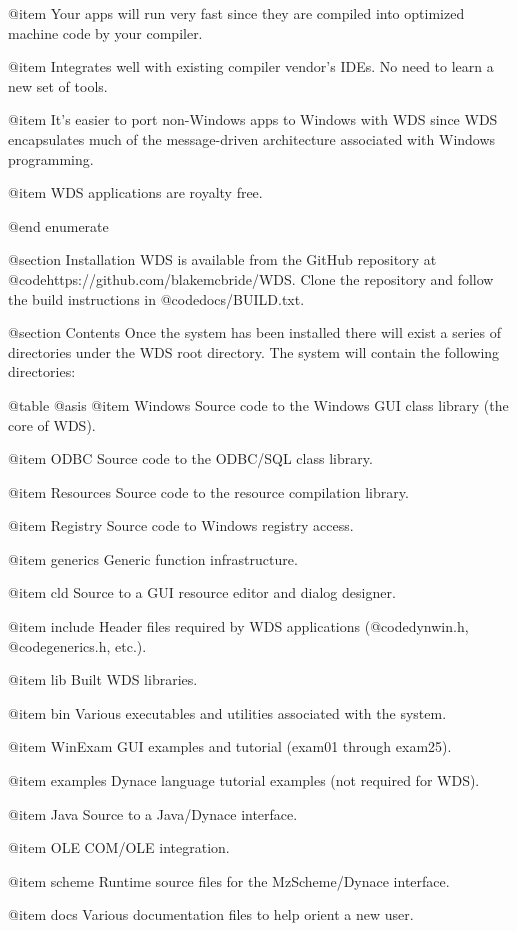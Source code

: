 @item
Your apps will run very fast since they are compiled into optimized
machine code by your compiler.

@item
Integrates well with existing compiler vendor's IDEs.  No need to
learn a new set of tools.

@item
It's easier to port non-Windows apps to Windows with WDS since WDS
encapsulates much of the message-driven architecture associated with
Windows programming.

@item
WDS applications are royalty free.

@end enumerate


@section Installation
WDS is available from the GitHub repository at
@code{https://github.com/blakemcbride/WDS}.  Clone the repository and
follow the build instructions in @code{docs/BUILD.txt}.



@section Contents
Once the system has been installed there will exist a series of
directories under the WDS root directory.  The system will contain
the following directories:


@table @asis
@item Windows
Source code to the Windows GUI class library (the core of WDS).

@item ODBC
Source code to the ODBC/SQL class library.

@item Resources
Source code to the resource compilation library.

@item Registry
Source code to Windows registry access.

@item generics
Generic function infrastructure.

@item cld
Source to a GUI resource editor and dialog designer.

@item include
Header files required by WDS applications (@code{dynwin.h},
@code{generics.h}, etc.).

@item lib
Built WDS libraries.

@item bin
Various executables and utilities associated with the system.

@item WinExam
GUI examples and tutorial (exam01 through exam25).

@item examples
Dynace language tutorial examples (not required for WDS).

@item Java
Source to a Java/Dynace interface.

@item OLE
COM/OLE integration.

@item scheme
Runtime source files for the MzScheme/Dynace interface.

@item docs
Various documentation files to help orient a new user.

